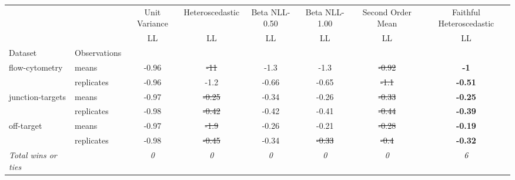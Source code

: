 \begin{tabular}{ll|c|c|c|c|c|c}
\toprule
{} & {} & {Unit Variance} & {Heteroscedastic} & {Beta NLL-0.50} & {Beta NLL-1.00} & {Second Order Mean} & {Faithful Heteroscedastic} \\
{} & {} & {LL} & {LL} & {LL} & {LL} & {LL} & {LL} \\
{Dataset} & {Observations} & {} & {} & {} & {} & {} & {} \\
\midrule
\multirow[t]{2}{*}{flow-cytometry} & means & -0.96 & \sout{-11} & -1.3 & -1.3 & \sout{-0.92} & \textbf{-1} \\
 & replicates & -0.96 & -1.2 & -0.66 & -0.65 & \sout{-1.1} & \textbf{-0.51} \\
\multirow[t]{2}{*}{junction-targets} & means & -0.97 & \sout{-0.25} & -0.34 & -0.26 & \sout{-0.33} & \textbf{-0.25} \\
 & replicates & -0.98 & \sout{-0.42} & -0.42 & -0.41 & \sout{-0.44} & \textbf{-0.39} \\
\multirow[t]{2}{*}{off-target} & means & -0.97 & \sout{-1.9} & -0.26 & -0.21 & \sout{-0.28} & \textbf{-0.19} \\
 & replicates & -0.98 & \sout{-0.45} & -0.34 & \sout{-0.33} & \sout{-0.4} & \textbf{-0.32} \\
\textit{{Total wins or ties}} &  & \textit{0} & \textit{0} & \textit{0} & \textit{0} & \textit{0} & \textit{6} \\
\bottomrule
\end{tabular}
